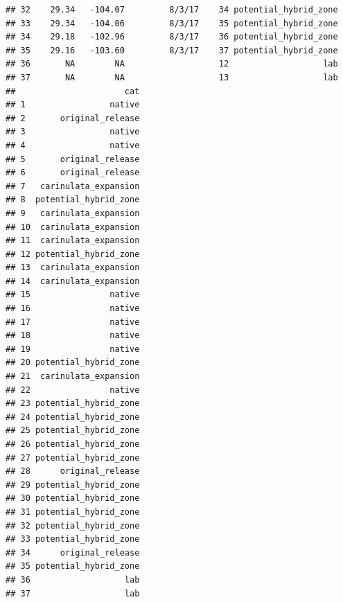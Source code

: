 \documentclass[]{article}
\newenvironment{Shaded}{\begin{snugshade}}{\end{snugshade}}
\newcommand{\KeywordTok}[1]{\textcolor[rgb]{0.13,0.29,0.53}{\textbf{#1}}}
\newcommand{\DataTypeTok}[1]{\textcolor[rgb]{0.13,0.29,0.53}{#1}}
\newcommand{\CharTok}[1]{\textcolor[rgb]{0.31,0.60,0.02}{#1}}
\newcommand{\StringTok}[1]{\textcolor[rgb]{0.31,0.60,0.02}{#1}}
\newcommand{\OperatorTok}[1]{\textcolor[rgb]{0.81,0.36,0.00}{\textbf{#1}}}
\newcommand{\NormalTok}[1]{#1}
\begin{document}
\begin{verbatim}
## 32    29.34   -104.07         8/3/17    34 potential_hybrid_zone
## 33    29.34   -104.06         8/3/17    35 potential_hybrid_zone
## 34    29.18   -102.96         8/3/17    36 potential_hybrid_zone
## 35    29.16   -103.60         8/3/17    37 potential_hybrid_zone
## 36       NA        NA                   12                   lab
## 37       NA        NA                   13                   lab
##                      cat
## 1                 native
## 2       original_release
## 3                 native
## 4                 native
## 5       original_release
## 6       original_release
## 7   carinulata_expansion
## 8  potential_hybrid_zone
## 9   carinulata_expansion
## 10  carinulata_expansion
## 11  carinulata_expansion
## 12 potential_hybrid_zone
## 13  carinulata_expansion
## 14  carinulata_expansion
## 15                native
## 16                native
## 17                native
## 18                native
## 19                native
## 20 potential_hybrid_zone
## 21  carinulata_expansion
## 22                native
## 23 potential_hybrid_zone
## 24 potential_hybrid_zone
## 25 potential_hybrid_zone
## 26 potential_hybrid_zone
## 27 potential_hybrid_zone
## 28      original_release
## 29 potential_hybrid_zone
## 30 potential_hybrid_zone
## 31 potential_hybrid_zone
## 32 potential_hybrid_zone
## 33 potential_hybrid_zone
## 34      original_release
## 35 potential_hybrid_zone
## 36                   lab
## 37                   lab
\end{verbatim}

\begin{Shaded}
\end{Shaded}
\end{document}
